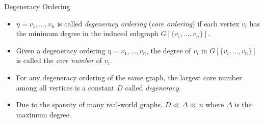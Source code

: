 \documentclass[9pt,notheorems]{beamer} %
\begin{document}
\begin{frame}{Degeneracy Ordering}
    \begin{itemize}
        \item $\eta =v_1,. . .,v_n$ is called \emph{degeneracy ordering} (\emph{core ordering}) if each vertex $v_i$ has the minimum degree in the induced subgraph $G[\{v_i,...,v_n\}]$.
        \item Given a degeneracy ordering $\eta =v_1,. . .,v_n$, the degree of $v_i$ in $G[\{v_i,...,v_n\}]$ is called the \emph{core number} of $v_i$. 
        \item For any degeneracy ordering of the same graph, the largest core number among all vertices is a constant $D$ called \emph{degeneracy}.
        \item Due to the sparsity of many real-world graphs, $D \ll \Delta \ll n$ where $\Delta$ is the maximum degree.
    \end{itemize}
    \begin{figure}
\end{figure}
\end{frame}
\end{document}
